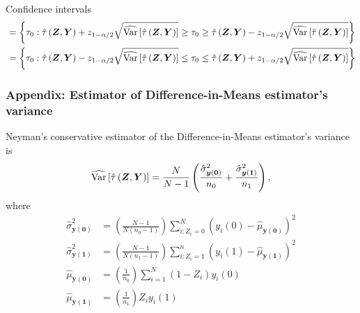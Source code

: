 \documentclass[table, xcolor = {dvipsnames}, 9pt]{beamer}
\theoremstyle{plain}
\DeclareMathOperator{\Var}{\rm{Var}}
\begin{document}
\begin{frame}{Confidence intervals}
\begin{equation*}
\begin{split}
& = \left\{\tau_0 : \hat{\tau}\left(\bm{Z}, \bm{Y}\right)+ z_{1 - \alpha/2} \sqrt{\widehat{\Var}\left[\hat{\tau}\left(\bm{Z}, \bm{Y}\right)\right] }\geq \tau_0 \geq  \hat{\tau}\left(\bm{Z}, \bm{Y}\right)- z_{1 - \alpha/2} \sqrt{\widehat{\Var}\left[\hat{\tau}\left(\bm{Z}, \bm{Y}\right)\right] }\right\} \\ 
& = \left\{\tau_0 : \hat{\tau}\left(\bm{Z}, \bm{Y}\right)- z_{1 - \alpha/2} \sqrt{\widehat{\Var}\left[\hat{\tau}\left(\bm{Z}, \bm{Y}\right)\right] }\leq \tau_0 \leq \hat{\tau}\left(\bm{Z}, \bm{Y}\right)+ z_{1 - \alpha/2} \sqrt{\widehat{\Var}\left[\hat{\tau}\left(\bm{Z}, \bm{Y}\right)\right] }\right\}
\end{split}
\end{equation*}
\normalsize
\end{frame}


\begin{frame}[t, label = Variance estimators]
\frametitle{Appendix: Estimator of Difference-in-Means estimator's variance}
\vfill
Neyman's conservative estimator of the Difference-in-Means estimator's variance is 
\begin{equation*}
\widehat{\Var}\left[\hat{\tau}\left(\bm{Z}, \bm{Y}\right)\right] = \frac{N}{N - 1}\left(\frac{\hat{\sigma}^2_{\bm{y}(\bm{0})}}{n_0} + \frac{\hat{\sigma}^2_{\bm{y}(\bm{1})}}{n_1} \right),
\end{equation*}
where 
\begin{align*}
\hat{\sigma}^2_{\bm{y}(\bm{0})} & = \left(\frac{N - 1}{N\left(n_0 - 1\right)}\right)\sum \limits_{i: Z_i = 0}^N \left(y_i(0) - \hat{\mu}_{\bm{y}(\bm{0})}\right)^2 \\
\hat{\sigma}^2_{\bm{y}(\bm{1})} & = \left(\frac{N - 1}{N\left(n_1 - 1\right)}\right)\sum \limits_{i: Z_i = 1}^{n} \left(y_i(1) - \hat{\mu}_{\bm{y}(\bm{1})}\right)^2 \\ 
\hat{\mu}_{\bm{y}(\bm{0})} & = \left(\frac{1}{n_0}\right) \sum \limits_{i = 1}^N \left(1 - Z_i\right)y_i(0) \\ 
\hat{\mu}_{\bm{y}(\bm{1})} & = \left(\frac{1}{n_1}\right) Z_i y_i(1)
\end{align*}
\vfill
\end{frame}
\end{document}
